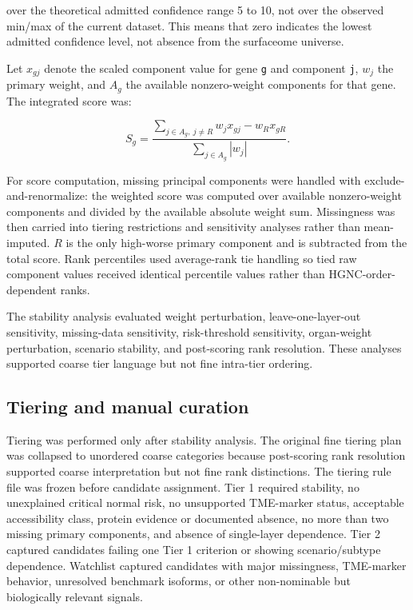 \documentclass[review,12pt,authoryear]{elsarticle}
\begin{document}
over the theoretical admitted confidence range 5 to 10, not over the observed min/\allowbreak{}max of the current dataset. This means that zero indicates the lowest admitted confidence level, not absence from the surfaceome universe.

Let $x_{gj}$ denote the scaled component value for gene \texttt{g} and component \texttt{j}, $w_j$ the primary weight, and $A_g$ the available nonzero-weight components for that gene. The integrated score was:

\begin{equation}
S_g =
\frac{
\sum_{j\in A_g,\ j\neq R} w_j x_{gj}
- w_R x_{gR}
}{
\sum_{j\in A_g} |w_j|
}.
\end{equation}

For score computation, missing principal components were handled with exclude-and-renormalize: the weighted score was computed over available nonzero-weight components and divided by the available absolute weight sum. Missingness was then carried into tiering restrictions and sensitivity analyses rather than mean-imputed. $R$ is the only high-worse primary component and is subtracted from the total score. Rank percentiles used average-rank tie handling so tied raw component values received identical percentile values rather than HGNC-order-dependent ranks.

The stability analysis evaluated weight perturbation, leave-one-layer-out sensitivity, missing-data sensitivity, risk-threshold sensitivity, organ-weight perturbation, scenario stability, and post-scoring rank resolution. These analyses supported coarse tier language but not fine intra-tier ordering.

\subsection{Tiering and manual curation}

Tiering was performed only after stability analysis. The original fine tiering plan was collapsed to unordered coarse categories because post-scoring rank resolution supported coarse interpretation but not fine rank distinctions. The tiering rule file was frozen before candidate assignment. Tier 1 required stability, no unexplained critical normal risk, no unsupported TME-marker status, acceptable accessibility class, protein evidence or documented absence, no more than two missing primary components, and absence of single-layer dependence. Tier 2 captured candidates failing one Tier 1 criterion or showing scenario/\allowbreak{}subtype dependence. Watchlist captured candidates with major missingness, TME-marker behavior, unresolved benchmark isoforms, or other non-nominable but biologically relevant signals.
\end{document}
